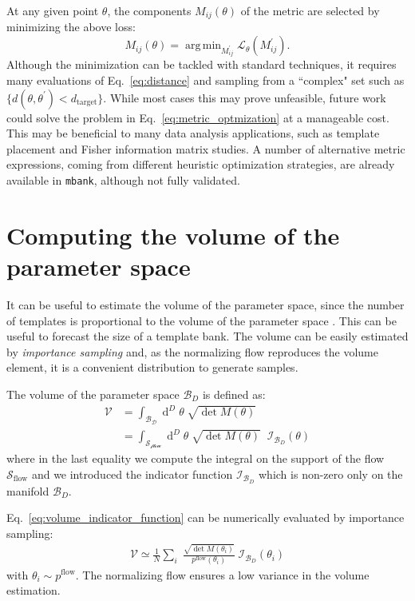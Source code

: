 \documentclass[twocolumn,showpacs,preprintnumbers,nofootinbib,prd,
superscriptaddress,10pt]{revtex4-2}
\newcommand{\dvol}[2]{\ensuremath{\operatorname{d}^{#2}\!{#1}}}
\DeclareMathOperator*{\argmin}{arg\,min}
\begin{document}
At any given point $\theta$, the components $M_{ij}(\theta)$ of the metric are selected by minimizing the above loss:
\begin{equation} \label{eq:metric_optmization}
	M_{ij}(\theta) = \argmin_{M^\prime_{ij}}  \mathcal{L}_\theta(M^\prime_{ij}).
\end{equation}
Although the minimization can be tackled with standard techniques, it requires many evaluations of Eq.~\eqref{eq:distance} and sampling from a ``complex" set such as ${\{d(\theta,\theta^\prime) < d_\mathrm{target}\}}$.
While most cases this may prove unfeasible, future work could solve the problem in Eq.~\eqref{eq:metric_optmization} at a manageable cost. This may be beneficial to many data analysis applications, such as template placement and Fisher information matrix studies.
A number of alternative metric expressions, coming from different heuristic optimization strategies, are already available in \texttt{mbank}, although not fully validated.

\section{Computing the volume of the parameter space}\label{app:parameter_space_volume}

It can be useful to estimate the volume of the parameter space, since the number of templates is proportional to the volume of the parameter space \cite{owen_metric}. This can be useful to forecast the size of a template bank.
The volume can be easily estimated by {\it importance sampling} and, as the normalizing flow reproduces the volume element, it is a convenient distribution to generate samples.

The volume of the parameter space $\mathcal{B}_D$ is defined as:
\begin{align}
	\mathcal{V} & = \int_\mathcal{\mathcal{B}_D} \dvol{\theta}{D} \; \sqrt{\det M(\theta)} \\
				& = \int_\mathcal{\mathcal{S}_\text{flow}} \dvol{\theta}{D} \; \sqrt{\det M(\theta)} \;\; \mathcal{I}_{\mathcal{B}_D}(\theta) \label{eq:volume_indicator_function}
\end{align}
where in the last equality we compute the integral on the support of the flow $\mathcal{S}_\text{flow}$ and we introduced the indicator function $\mathcal{I}_{\mathcal{B}_D}$ which is non-zero only on the manifold $\mathcal{B}_D$.

Eq.~\eqref{eq:volume_indicator_function} can be numerically evaluated by importance sampling:
%
\begin{align}\label{eq:vol_IS}
	\mathcal{V} \simeq \frac{1}{N} \sum_i \; \frac{\sqrt{\det M(\theta_i)}}{p^\text{flow}(\theta_i)} \; \mathcal{I}_{\mathcal{B}_D}(\theta_i)
\end{align}
with  $\theta_i \sim p^\text{flow}$.
The normalizing flow ensures a low variance in the volume estimation.
\end{document}
